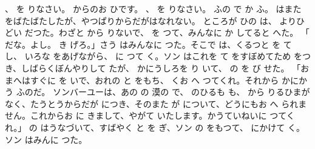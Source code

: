 \documentclass[a4paper,
tate,
book]
{jlreq}
\begin{document}
   、 を りなさい。 からのお ひです。 、 を りなさい。 ふの で か ふ。 はまた をばたばたしたが、やつぱりからだがはなれない。
  ところが ひの は、 よりひどい だつた。わざと から りないで、 を つて、みんなに か してると へた。
「 だな。よし。 き げろ。」さう はみんなに つた。そこで  は、くるつと を て し、 いろな をあげながら、  に つて く。ソン はこれを て をすぼめてため をつき、しばらくぼんやりして たが、 かにうしろを り いて、 の を び せた。
「おまへはすぐに を いで、おれの と をもち、 くお へ つてくれ。それから かにかう ふのだ。  ソンバーユーは、あの の 漠の で、 のひるも も、 から りるひまがなく、たうとうからだが につき、そのまた が について、どうにもお へ られません。これからお に きまして、やがて いたします。かうていねいに つてくれ。」
   の はうなづいて、すばやく と を ぎ、ソン の をもつて、  にかけて く。ソン はみんに つた。
\end{document}
